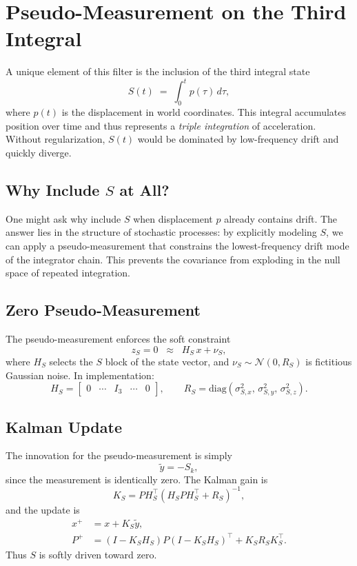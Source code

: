 \documentclass[10pt]{extarticle}
\begin{document}
\section{Pseudo-Measurement on the Third Integral}
\label{sec:pseudo-S}

A unique element of this filter is the inclusion of the third integral state
\[
S(t) \;=\; \int_0^t p(\tau)\,d\tau,
\]
where $p(t)$ is the displacement in world coordinates.
This integral accumulates position over time and thus represents a 
\emph{triple integration} of acceleration. Without regularization, $S(t)$
would be dominated by low-frequency drift and quickly diverge.

\subsection{Why Include $S$ at All?}
One might ask why include $S$ when displacement $p$ already contains drift.
The answer lies in the structure of stochastic processes: by explicitly modeling
$S$, we can apply a pseudo-measurement that constrains the lowest-frequency drift
mode of the integrator chain. This prevents the covariance from exploding in the
null space of repeated integration.

\subsection{Zero Pseudo-Measurement}
The pseudo-measurement enforces the soft constraint
\begin{equation}
z_S = 0 \;\;\approx\;\; H_S\,x + \nu_S,
\label{eq:ps-meas}
\end{equation}
where $H_S$ selects the $S$ block of the state vector, and $\nu_S\sim\mathcal{N}(0,R_S)$
is fictitious Gaussian noise. In implementation:
\begin{equation}
H_S = \begin{bmatrix}0 & \cdots & I_3 & \cdots & 0\end{bmatrix},
\qquad
R_S = \mathrm{diag}(\sigma_{S,x}^2,\,\sigma_{S,y}^2,\,\sigma_{S,z}^2).
\label{eq:ps-HR}
\end{equation}

\subsection{Kalman Update}
The innovation for the pseudo-measurement is simply
\begin{equation}
\tilde y = -S_k,
\end{equation}
since the measurement is identically zero. The Kalman gain is
\begin{equation}
K_S = P H_S^\top (H_S P H_S^\top + R_S)^{-1},
\end{equation}
and the update is
\begin{align}
x^+ &= x + K_S\tilde y,\\
P^+ &= (I-K_SH_S)P(I-K_SH_S)^\top + K_SR_SK_S^\top.
\end{align}
Thus $S$ is softly driven toward zero.
\end{document}
